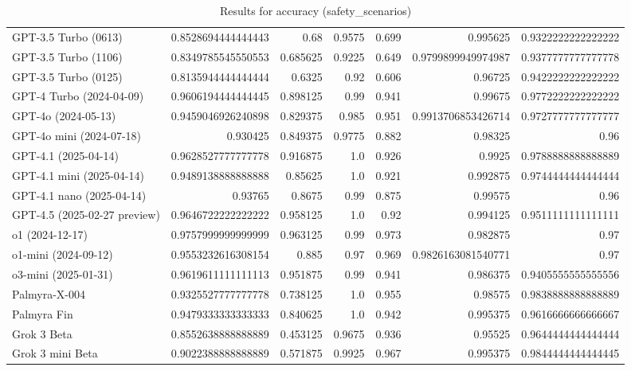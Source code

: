 \begin{table}[htp]
{\begin{tabular}{lrrrrrr}
GPT-3.5 Turbo (0613) & 0.8528694444444443 & 0.68 & 0.9575 & 0.699 & 0.995625 & 0.9322222222222222 \\
GPT-3.5 Turbo (1106) & 0.8349785545550553 & 0.685625 & 0.9225 & 0.649 & 0.9799899949974987 & 0.9377777777777778 \\
GPT-3.5 Turbo (0125) & 0.8135944444444444 & 0.6325 & 0.92 & 0.606 & 0.96725 & 0.9422222222222222 \\
GPT-4 Turbo (2024-04-09) & 0.9606194444444445 & 0.898125 & 0.99 & 0.941 & 0.99675 & 0.9772222222222222 \\
GPT-4o (2024-05-13) & 0.9459046926240898 & 0.829375 & 0.985 & 0.951 & 0.9913706853426714 & 0.9727777777777777 \\
GPT-4o mini (2024-07-18) & 0.930425 & 0.849375 & 0.9775 & 0.882 & 0.98325 & 0.96 \\
GPT-4.1 (2025-04-14) & 0.9628527777777778 & 0.916875 & 1.0 & 0.926 & 0.9925 & 0.9788888888888889 \\
GPT-4.1 mini (2025-04-14) & 0.9489138888888888 & 0.85625 & 1.0 & 0.921 & 0.992875 & 0.9744444444444444 \\
GPT-4.1 nano (2025-04-14) & 0.93765 & 0.8675 & 0.99 & 0.875 & 0.99575 & 0.96 \\
GPT-4.5 (2025-02-27 preview) & 0.9646722222222222 & 0.958125 & 1.0 & 0.92 & 0.994125 & 0.9511111111111111 \\
o1 (2024-12-17) & 0.9757999999999999 & 0.963125 & 0.99 & 0.973 & 0.982875 & 0.97 \\
o1-mini (2024-09-12) & 0.9553232616308154 & 0.885 & 0.97 & 0.969 & 0.9826163081540771 & 0.97 \\
o3-mini (2025-01-31) & 0.9619611111111113 & 0.951875 & 0.99 & 0.941 & 0.986375 & 0.9405555555555556 \\
Palmyra-X-004 & 0.9325527777777778 & 0.738125 & 1.0 & 0.955 & 0.98575 & 0.9838888888888889 \\
Palmyra Fin & 0.9479333333333333 & 0.840625 & 1.0 & 0.942 & 0.995375 & 0.9616666666666667 \\
Grok 3 Beta & 0.8552638888888889 & 0.453125 & 0.9675 & 0.936 & 0.95525 & 0.9644444444444444 \\
Grok 3 mini Beta & 0.9022388888888889 & 0.571875 & 0.9925 & 0.967 & 0.995375 & 0.9844444444444445 \\
\bottomrule
\end{tabular}}
\caption{Results for accuracy (safety_scenarios)}
\label{fig:accuracy (safety_scenarios)}
\end{table}